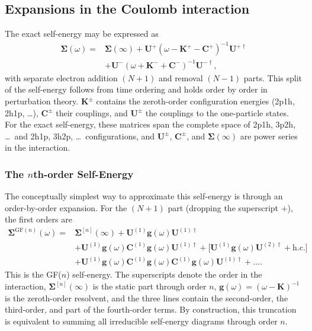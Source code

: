 \documentclass[aip,jcp,reprint,noshowkeys,superscriptaddress]{revtex4-2}
\begin{document}
\clearpage
\newpage
\subsection{Expansions in the Coulomb interaction}
The exact self-energy may be expressed as 
\begin{align}
    \pmb{\Sigma}(\omega) =& \pmb{\Sigma}(\infty) + \mathbf{U}^{+} \left(\omega - \mathbf{K}^{+} - \mathbf{C}^{+}\right)^{-1} \mathbf{U}^{+\dagger} \nonumber \\
    &+ \mathbf{U}^{-} \left(\omega + \mathbf{K}^{-} + \mathbf{C}^{-}\right)^{-1} \mathbf{U}^{-\dagger},
    \label{eq:SigmaADC}
\end{align}
with separate electron addition $(N+1)$ and removal $(N-1)$ parts. This split of the self-energy follows from time ordering and holds order by order in perturbation theory. $\mathbf{K}^{\pm}$ contains the zeroth-order configuration energies (2p1h, 2h1p, \dots), $\mathbf{C}^{\pm}$ their couplings, and $\mathbf{U}^{\pm}$ the couplings to the one-particle states. For the exact self-energy, these matrices span the complete space of 2p1h, 3p2h, \dots\ and 2h1p, 3h2p, \dots\ configurations, and $\mathbf{U}^{\pm}$, $\mathbf{C}^{\pm}$, and $\pmb{\Sigma}(\infty)$ are power series in the interaction.

\subsubsection{\label{sec:GFn}The $n$th-order Self-Energy}

The conceptually simplest way to approximate this self-energy is through an order-by-order expansion. For the $(N+1)$ part (dropping the superscript $+$), the first orders are
\begin{align}
    \pmb{\Sigma}^{\mathrm{GF}(n)}(\omega) =& \pmb{\Sigma}^{[n]}(\infty) + \mathbf{U}^{(1)} \mathbf{g}(\omega) \mathbf{U}^{(1)\dagger} \nonumber \\
    &+ \mathbf{U}^{(1)} \mathbf{g}(\omega) \mathbf{C}^{(1)} \mathbf{g}(\omega) \mathbf{U}^{(1)\dagger} + \big[ \mathbf{U}^{(1)} \mathbf{g}(\omega) \mathbf{U}^{(2)\dagger} + \mathrm{h.c.} \big] \nonumber \\
    &+ \mathbf{U}^{(1)} \mathbf{g}(\omega) \mathbf{C}^{(1)} \mathbf{g}(\omega) \mathbf{C}^{(1)} \mathbf{g}(\omega) \mathbf{U}^{(1)\dagger} + \dots.
    \label{eq:GFn}
\end{align}
This is the GF($n$) self-energy. The superscripts denote the order in the interaction, $\pmb{\Sigma}^{[n]}(\infty)$ is the static part through order $n$, $\mathbf{g}(\omega) = (\omega - \mathbf{K})^{-1}$ is the zeroth-order resolvent, and the three lines contain the second-order, the third-order, and part of the fourth-order terms. By construction, this truncation is equivalent to summing all irreducible self-energy diagrams through order $n$.
\end{document}
